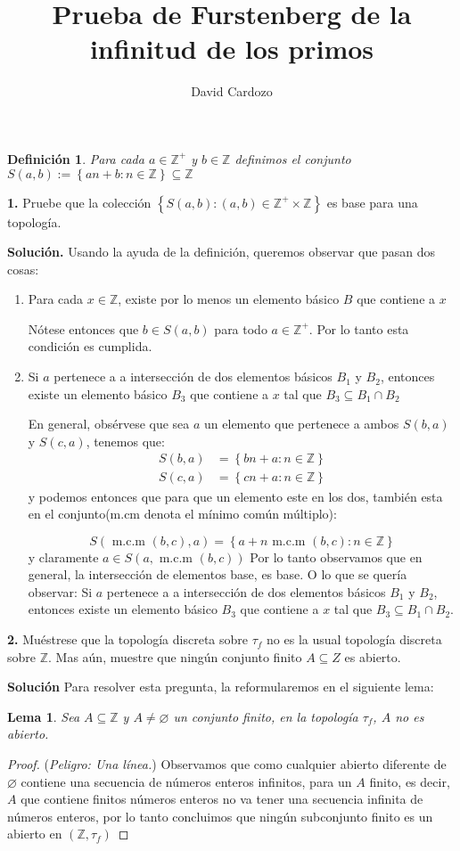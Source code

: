 \documentclass[notitlepage]{report}
\author{David Cardozo}
\title{Prueba de Furstenberg de la infinitud de los primos}
\newtheorem{define}{Definición}
\newtheorem{lem}{Lema}
\newcommand{\set}[1]{\left\lbrace #1 \right\rbrace}
\newcommand{\ZZ}{\mathbb{Z}}
\newcommand{\qt}[1]{\textrm{#1}}
\newcommand{\contained}{\subseteq}
\begin{document}
\maketitle

\begin{define}
	Para cada $a \in \ZZ^+ $ y $b \in \ZZ$ definimos el conjunto $S(a,b) := \set{an + b: n \in \ZZ} \contained \ZZ $
\end{define}
\textbf{1.} Pruebe que la colección $ \set{S(a,b) : (a,b) \in \ZZ^+ \times \ZZ} $ es base para una topología.

\textbf{Solución.}
Usando la ayuda de la definición, queremos observar que pasan dos cosas:
\begin{enumerate}
	\item Para cada $x \in \ZZ$, existe por lo menos un elemento básico $B$ que contiene a $x$
	
	Nótese entonces que $ b \in S(a,b) $ para todo $a \in \ZZ^+$. Por lo tanto esta condición es cumplida.
	
	\item Si $a$ pertenece a a intersección de dos elementos básicos $B_1$ y $ B_2$, entonces existe un elemento básico $B_3$ que contiene a $x$ tal que $ B_3 \contained B_1 \cap B_2$
	
	En general, obsérvese que sea $a$ un elemento que pertenece a ambos $S(b,a)$ y $S(c,a) $, tenemos que:
	\begin{align*}
	S(b,a) &= \set{bn + a: n \in \ZZ} \\
	S(c,a) &= \set{cn + a: n \in \ZZ}
	\end{align*}
	y podemos entonces que para que un elemento este en los dos, también esta en el conjunto(m.cm denota el mínimo común múltiplo):
	
	\[ S(\qt{ m.c.m } (b,c),a) = \set{a + n\qt{ m.c.m } (b,c) : n \in \ZZ}   \]
	y claramente $a \in S(a,\qt{ m.c.m } (b,c))  $
	Por lo tanto observamos que en general, la intersección de elementos base, es base. O lo que se quería observar: Si $a$ pertenece a a intersección de dos elementos básicos $B_1$ y $ B_2$, entonces existe un elemento básico $B_3$ que contiene a $x$ tal que $ B_3 \contained B_1 \cap B_2$.
\end{enumerate}


\textbf{2.} Muéstrese que la topología discreta sobre $\tau_f$ no es la usual topología discreta sobre $\ZZ$. Mas aún, muestre que ningún conjunto finito $ A \contained Z$ es abierto.

\textbf{Solución}
Para resolver esta pregunta, la reformularemos en el siguiente lema:
\begin{lem}
	Sea $A \contained \ZZ $  y $A \neq \varnothing$ un conjunto finito, en la topología $\tau_f$, $A$ no es abierto.
\end{lem}
\begin{proof}(\emph{Peligro: Una línea.})
	Observamos que como cualquier abierto diferente de $ \varnothing$ contiene una secuencia de números enteros infinitos, para un $A$ finito, es decir, $A$ que contiene finitos números enteros no va tener una secuencia infinita de números enteros, por lo tanto concluimos que ningún subconjunto finito es un abierto en $ (\ZZ, \tau_f) $ 
\end{proof}
\end{document}
